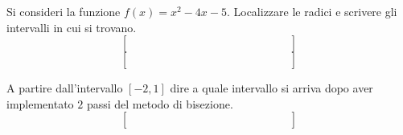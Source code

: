 Si consideri la funzione $f(x)=x^2-4x-5$. Localizzare le radici 
e scrivere gli intervalli in cui si trovano. 
\bigskip
\[
\left [
\begin{array}{cccccccccccccc}
\quad &  \quad & \quad &  \quad & \quad & \quad & \quad & \quad  \\
\quad &  \quad & \quad &  \quad & \quad &  \quad & \quad & \quad \\
\quad &  \quad & \quad &  \quad  & \quad  & \quad & \quad & \quad
\end{array}\right]
\]
\bigskip
\[
\left [
\begin{array}{cccccccccccccc}
\quad &  \quad & \quad &  \quad & \quad & \quad & \quad & \quad  \\
\quad &  \quad & \quad &  \quad & \quad &  \quad & \quad & \quad \\
\quad &  \quad & \quad &  \quad  & \quad  & \quad & \quad & \quad
\end{array}\right]
\]
\bigskip

\noindent A partire dall'intervallo $[-2,1]$ dire a quale 
intervallo si arriva dopo aver implementato $2$ passi del metodo di bisezione.
\bigskip
\[
\left [
\begin{array}{cccccccccccccc}
\quad &  \quad & \quad &  \quad & \quad & \quad & \quad & \quad  \\
\quad &  \quad & \quad &  \quad & \quad &  \quad & \quad & \quad \\
\quad &  \quad & \quad &  \quad  & \quad  & \quad & \quad & \quad
\end{array}\right]
\]
